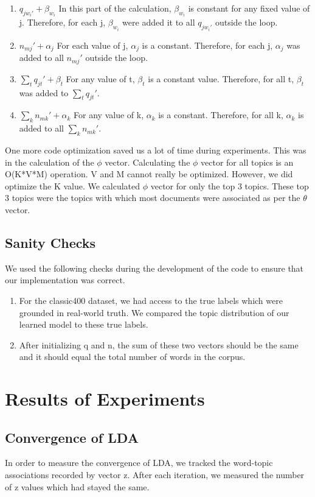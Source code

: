 \documentclass[11pt,a4paper,oneside]{article}
\begin{document}
\begin{enumerate}
\item $q_{j w_{i}'}+\beta_{w_i}$ In this part of the calculation, $\beta_{w_i}$ is constant for any fixed value of j. Therefore, for each j, $\beta_{w_i}$ were added it to all $q_{j w_{i}'}$ outside the loop. 
\item $n_{mj}' + \alpha_j$ For each value of j, $\alpha_j$ is a constant. Therefore, for each j, $\alpha_j$ was added to all $n_{mj}'$ outside the loop.
\item $\sum_t{q_{jt}' + \beta_t}$ For any value of t, $\beta_t$ is a constant value. Therefore, for all t, $\beta_t$ was added to $\sum_t{q_{jt}}'$.
\item $\sum_k{n_{mk}' + \alpha_k}$ For any value of k, $\alpha_k$ is a constant. Therefore, for all k, $\alpha_k$ is added to all $\sum_k{n_{mk}}'$.
\end{enumerate}

\bigskip
One more code optimization saved us a lot of time during experiments. This was in the calculation of the $\phi$ vector. Calculating the $\phi$ vector for all topics is an O(K*V*M) operation. V and M cannot really be optimized. However, we did optimize the K value. We calculated $\phi$ vector for only the top 3 topics. These top 3 topics were the topics with which most documents were associated as per the $\theta$ vector.


\subsection{Sanity Checks}
We used the following checks during the development of the code to ensure that our implementation was correct.
\begin{enumerate}
\item For the classic400 dataset, we had access to the true labels which were grounded in real-world truth. We compared the topic distribution of our learned model to these true labels. 
\item After initializing q and n, the sum of these two vectors should be the same and it should equal the total number of words in the corpus.
\end{enumerate}

\section{Results of Experiments}
\label{sec:Results}

\subsection{Convergence of LDA}
In order to measure the convergence of LDA, we tracked the word-topic associations recorded by vector z. After each iteration, we measured the number of z values which had stayed the same. 
\end{document}
